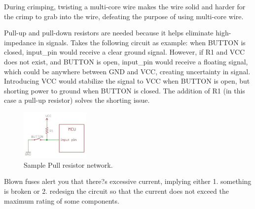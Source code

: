 \documentclass{article}
\begin{document}
During crimping, twisting a multi-core wire makes the wire solid and harder for the crimp to grab into the wire, defeating the purpose of using multi-core wire. \par
Pull-up and pull-down resistors are needed because it helps eliminate high-impedance in signals. Takes the following circuit as example: when BUTTON is closed, input\_pin would receive a clear ground signal. However, if R1 and VCC does not exist, and BUTTON is open, input\_pin would receive a floating signal, which could be anywhere between GND and VCC, creating uncertainty in signal. Introducing VCC would stabilize the signal to VCC when BUTTON is open, but shorting power to ground when BUTTON is closed. The addition of R1 (in this case a pull-up resistor) solves the shorting issue.

\begin{figure}[!h]
	\center
	\includegraphics[width=0.3\textwidth, keepaspectratio]{pull}
	\caption{Sample Pull resistor network.}
	\label{fig:pull}
\end{figure}

Blown fuses alert you that there?s excessive current, implying either 1. something is broken or 2. redesign the circuit so that the current does not exceed the maximum rating of some components.
\end{document}
